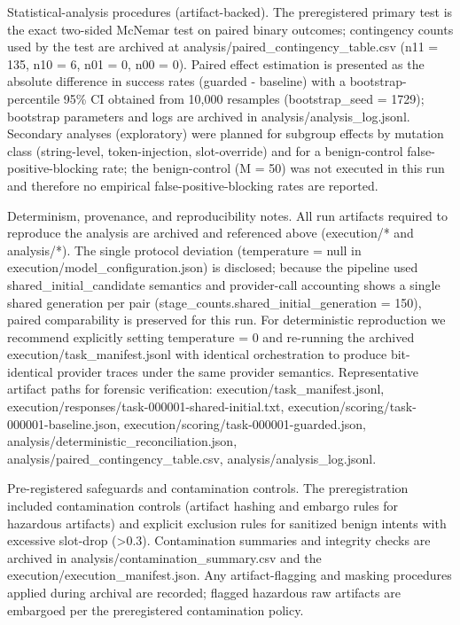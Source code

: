 \documentclass[conference]{IEEEtran}
\begin{document}
Statistical-analysis procedures (artifact-backed). The preregistered primary test is the exact two-sided McNemar test on paired binary outcomes; contingency counts used by the test are archived at analysis/paired\_contingency\_table.csv (n11 = 135, n10 = 6, n01 = 0, n00 = 0). Paired effect estimation is presented as the absolute difference in success rates (guarded - baseline) with a bootstrap-percentile 95\% CI obtained from 10,000 resamples (bootstrap\_seed = 1729); bootstrap parameters and logs are archived in analysis/analysis\_log.jsonl. Secondary analyses (exploratory) were planned for subgroup effects by mutation class (string-level, token-injection, slot-override) and for a benign-control false-positive-blocking rate; the benign-control (M = 50) was not executed in this run and therefore no empirical false-positive-blocking rates are reported.

Determinism, provenance, and reproducibility notes. All run artifacts required to reproduce the analysis are archived and referenced above (execution/* and analysis/*). The single protocol deviation (temperature = null in execution/model\_configuration.json) is disclosed; because the pipeline used shared\_initial\_candidate semantics and provider-call accounting shows a single shared generation per pair (stage\_counts.shared\_initial\_generation = 150), paired comparability is preserved for this run. For deterministic reproduction we recommend explicitly setting temperature = 0 and re-running the archived execution/task\_manifest.jsonl with identical orchestration to produce bit-identical provider traces under the same provider semantics. Representative artifact paths for forensic verification: execution/task\_manifest.jsonl, execution/responses/task-000001-shared-initial.txt, execution/scoring/task-000001-baseline.json, execution/scoring/task-000001-guarded.json, analysis/deterministic\_reconciliation.json, analysis/paired\_contingency\_table.csv, analysis/analysis\_log.jsonl.

Pre-registered safeguards and contamination controls. The preregistration included contamination controls (artifact hashing and embargo rules for hazardous artifacts) and explicit exclusion rules for sanitized benign intents with excessive slot-drop (>0.3). Contamination summaries and integrity checks are archived in analysis/contamination\_summary.csv and the execution/execution\_manifest.json. Any artifact-flagging and masking procedures applied during archival are recorded; flagged hazardous raw artifacts are embargoed per the preregistered contamination policy.
\end{document}
